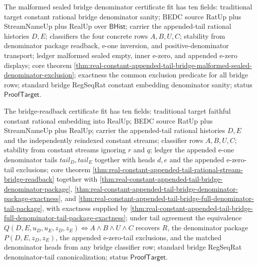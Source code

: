 The malformed sealed bridge denominator certificate fit has ten fields:
traditional target constant rational bridge denominator sanity; BEDC source
RatUp plus StreamNameUp plus RealUp over $\mathsf{BHist}$; carrier the
appended-tail rational histories $D,E$; classifiers the four concrete rows
$A,B,U,C$; stability from denominator package readback, e-one inversion, and
positive-denominator transport; ledger malformed sealed empty, inner e-zero,
and appended e-zero displays; core theorem
\autoref{thm:real-constant-appended-tail-bridge-malformed-sealed-denominator-exclusion};
exactness the common exclusion predicate for all bridge rows; standard bridge
RegSeqRat constant embedding denominator sanity; status $\mathsf{ProofTarget}$.

The bridge-readback certificate fit has ten fields: traditional target faithful
constant rational embedding into RealUp; BEDC source RatUp plus StreamNameUp
plus RealUp; carrier the appended-tail rational histories $D,E$ and the
independently reindexed constant streams; classifier rows $A,B,U,C$; stability
from constant streams ignoring $r$ and $q$; ledger the appended e-one
denominator tails $tail_D,tail_E$ together with heads $d,e$ and the appended
e-zero-tail exclusions; core theorem
\autoref{thm:real-constant-appended-tail-rational-stream-bridge-readback}
together with
\autoref{thm:real-constant-appended-tail-bridge-denominator-package},
\autoref{thm:real-constant-appended-tail-bridge-denominator-package-exactness},
and
\autoref{thm:real-constant-appended-tail-bridge-full-denominator-tail-package},
with exactness supplied by
\autoref{thm:real-constant-appended-tail-bridge-full-denominator-tail-package-exactness};
under tail agreement the equivalence
$Q(D,E,u_D,u_E,z_D,z_E)\Longleftrightarrow A\land B\land U\land C$ recovers
$R$, the denominator package $P(D,E,z_D,z_E)$, the appended e-zero-tail
exclusions, and the matched denominator heads from any bridge classifier row;
standard bridge RegSeqRat denominator-tail canonicalization; status
$\mathsf{ProofTarget}$.
